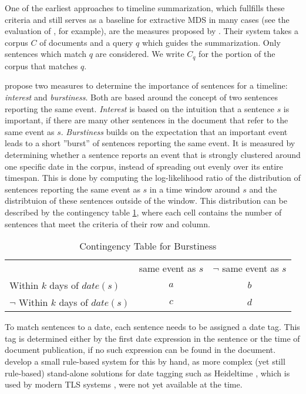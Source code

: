 \documentclass[a4paper,BCOR=10mm]{report}
\numberwithin{lemma}{chapter}
\numberwithin{definition}{chapter}
\begin{document}
One of the earliest approaches to timeline summarization, which fullfills these criteria and still serves as a baseline for extractive MDS in many cases (see the evaluation of \citet{markert}, for example), are the measures proposed by \citet{chieu}.
Their system takes a corpus $C$ of documents and a query $q$ which guides the summarization. Only sentences which match $q$ are considered. We write $C_q$ for the portion of the corpus that matches $q$.

\citeauthor{chieu} propose two measures to determine the importance of sentences for a timeline: \textit{interest} and \textit{burstiness}.
Both are based around the concept of two sentences reporting the same event. \textit{Interest} is based on the intuition that a sentence $s$ is important, if there are many other sentences in the document that refer to the same event as $s$. \textit{Burstiness} builds on the expectation that an important event leads to a short ''burst'' of sentences reporting the same event.
It is measured by determining whether a sentence reports an event that is strongly clustered around one specific date in the corpus, instead of spreading out evenly over its entire timespan. This is done by computing the log-likelihood ratio of the distribution of sentences reporting the same event as $s$ in a time window around $s$ and the distribtuion of these sentences outside of the window.
This distribution can be described by the contingency table \ref{tab:chieu}, where each cell contains the number of sentences that meet the criteria of their row and column.

\begin{table}
\begin{tabular}{|l|c|c|}
\hline
& same event as $s$ & $\lnot$ same event as $s$ \\
Within $k$ days of $\mathit{date}(s)$ & $a$ & $b$ \\
$\lnot$ Within $k$ days of $\mathit{date}(s)$ & $c$ & $d$ \\
\hline
\end{tabular}
\caption{Contingency Table for Burstiness}
\label{tab:chieu}
\end{table}

To match sentences to a date, each sentence needs to be assigned a date tag. This tag is determined either by the first date expression in the sentence or the time of document publication, if no such expression can be found in the document. \citeauthor{chieu} develop a small rule-based system for this by hand, as more complex (yet still rule-based) stand-alone solutions for date tagging such as Heideltime \citep{heideltime}, which is used by modern TLS systems \citep{tran-headlines, markert}, were not yet available at the time.
\end{document}
